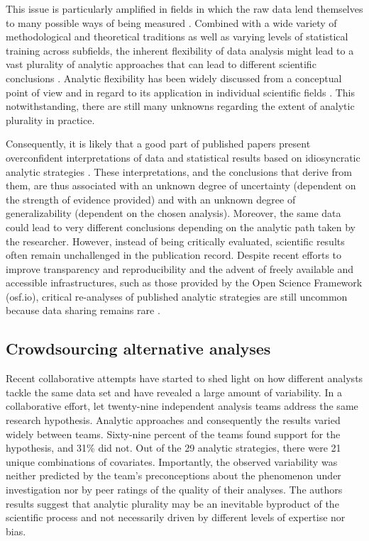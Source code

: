 \documentclass[Review,times,sageh]{sagej}
\begin{document}
This issue is particularly amplified in fields in which the raw data
lend themselves to many possible ways of being measured
\citep{roettger2019researcher}. Combined with a wide variety of
methodological and theoretical traditions as well as varying levels of
statistical training across subfields, the inherent flexibility of data
analysis might lead to a vast plurality of analytic approaches that can
lead to different scientific conclusions \citep{roettger2019emergent}.
Analytic flexibility has been widely discussed from a conceptual point
of view \citep{simmons2011false, wagenmakers2012agenda, nosek2014method}
and in regard to its application in individual scientific fields
\citep[e.g.][]{wicherts2016, charles2019, roettger2019researcher}. This
notwithstanding, there are still many unknowns regarding the extent of
analytic plurality in practice.

Consequently, it is likely that a good part of published papers present
overconfident interpretations of data and statistical results based on
idiosyncratic analytic strategies
\citep[e.g.,][]{simmons2011false, gelman2014statistical}. These
interpretations, and the conclusions that derive from them, are thus
associated with an unknown degree of uncertainty (dependent on the
strength of evidence provided) and with an unknown degree of
generalizability (dependent on the chosen analysis). Moreover, the same
data could lead to very different conclusions depending on the analytic
path taken by the researcher. However, instead of being critically
evaluated, scientific results often remain unchallenged in the
publication record. Despite recent efforts to improve transparency and
reproducibility \citep[e.g.][]{miguel2014promoting, klein2018practical}
and the advent of freely available and accessible infrastructures, such
as those provided by the Open Science Framework (osf.io), critical
re-analyses of published analytic strategies are still uncommon because
data sharing remains rare \citep{wicherts2006poor}.

\subsection{Crowdsourcing alternative
analyses}\label{crowdsourcing-alternative-analyses}

Recent collaborative attempts have started to shed light on how
different analysts tackle the same data set and have revealed a large
amount of variability. In a collaborative effort,
\citet{silberzahn2018many} let twenty-nine independent analysis teams
address the same research hypothesis. Analytic approaches and
consequently the results varied widely between teams. Sixty-nine percent
of the teams found support for the hypothesis, and 31\% did not. Out of
the 29 analytic strategies, there were 21 unique combinations of
covariates. Importantly, the observed variability was neither predicted
by the team's preconceptions about the phenomenon under investigation
nor by peer ratings of the quality of their analyses. The authors
results suggest that analytic plurality may be an inevitable byproduct
of the scientific process and not necessarily driven by different levels
of expertise nor bias.
\end{document}
